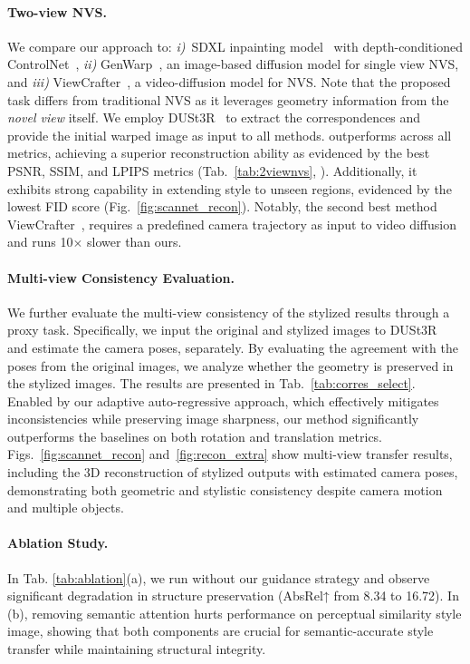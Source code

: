 \paragraph{\bf{Two-view NVS.}}
We compare our approach to: \textit{i)}~SDXL inpainting model~\cite{podell2024sdxl} with depth-conditioned ControlNet~\cite{zhang2023adding}, \textit{ii)} GenWarp~\cite{seo2024genwarp}, an image-based diffusion model for single view NVS, and \textit{iii)} ViewCrafter~\cite{yu2024viewcrafter}, a video-diffusion model for NVS. Note that the proposed task differs from traditional NVS as it leverages geometry information from the \textit{novel view} itself. We employ DUSt3R~\cite{wang2024dust3r} to extract the correspondences and provide the initial warped image as input to all methods. \ours outperforms  across all metrics, achieving a superior reconstruction ability as evidenced by the best PSNR, SSIM, and LPIPS metrics (\cf Tab.~\ref{tab:2viewnvs}, ). Additionally, it exhibits strong capability in extending style to unseen regions, evidenced by the lowest FID score (Fig.~\ref{fig:scannet_recon}). Notably, the second best method ViewCrafter~\cite{yu2024viewcrafter}, requires a predefined camera trajectory as input to video diffusion and runs 10$\times$ slower than ours. 



\paragraph{\bf{Multi-view Consistency Evaluation.}}
We further evaluate the multi-view consistency of the stylized results through a proxy task. Specifically, we input the original and stylized images to DUSt3R~\cite{wang2024dust3r} and estimate the camera poses, separately. By evaluating the agreement with the poses from the original images, we analyze whether the geometry is preserved in the stylized images. The results are presented in Tab.~\ref{tab:corres_select}. Enabled by our adaptive auto-regressive approach, which effectively mitigates inconsistencies while preserving image sharpness, our method significantly outperforms the baselines on both rotation and translation metrics.
Figs.~\ref{fig:scannet_recon} and~\ref{fig:recon_extra} show multi-view transfer results, including the 3D reconstruction of stylized outputs with estimated camera poses, demonstrating both geometric and stylistic consistency despite camera motion and multiple objects.


\paragraph{\bf{Ablation Study.}} 
In Tab. \ref{tab:ablation}(a), we run \ours without our guidance strategy and observe significant degradation in structure preservation (AbsRel↑ from 8.34 to 16.72). In (b), removing semantic attention hurts performance on perceptual similarity \wrt style image, showing that both components are crucial for semantic-accurate style transfer while maintaining structural integrity.


